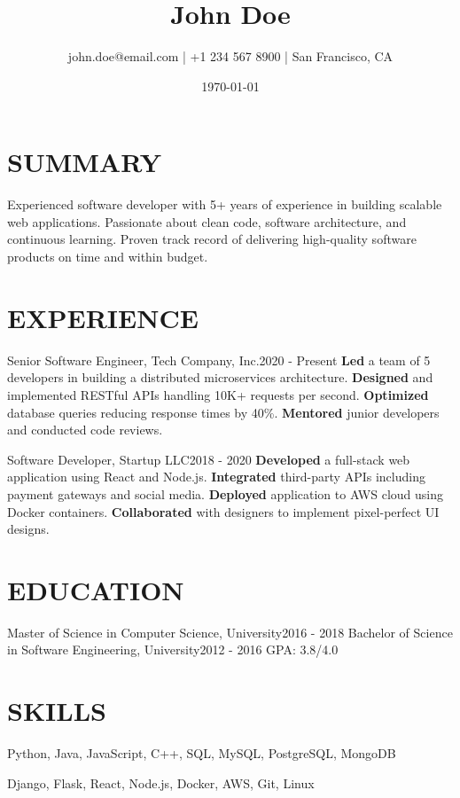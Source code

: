 \documentclass[10pt,a4paper]{article}
\begin{document}
\title{John Doe}
\author{john.doe@email.com | +1 234 567 8900 | San Francisco, CA}
\date{\today}
\maketitle
\vspace{-1cm}

\section{SUMMARY}
Experienced software developer with 5+ years of experience in building scalable web applications. Passionate about clean code, software architecture, and continuous learning. Proven track record of delivering high-quality software products on time and within budget.

\section{EXPERIENCE}
Senior Software Engineer, Tech Company, Inc.\hfill 2020 - Present
\textbf{Led} a team of 5 developers in building a distributed microservices architecture.
\textbf{Designed} and implemented RESTful APIs handling 10K+ requests per second.
\textbf{Optimized} database queries reducing response times by 40\%.
\textbf{Mentored} junior developers and conducted code reviews.

Software Developer, Startup LLC\hfill 2018 - 2020
\textbf{Developed} a full-stack web application using React and Node.js.
\textbf{Integrated} third-party APIs including payment gateways and social media.
\textbf{Deployed} application to AWS cloud using Docker containers.
\textbf{Collaborated} with designers to implement pixel-perfect UI designs.

\section{EDUCATION}
Master of Science in Computer Science, University\hfill 2016 - 2018
Bachelor of Science in Software Engineering, University\hfill 2012 - 2016
GPA: 3.8/4.0

\section{SKILLS}
\begin{description}
\item[\textbf{Programming Languages}] Python, Java, JavaScript, C++, SQL, MySQL, PostgreSQL, MongoDB
\item[\textbf{Frameworks \& Libraries}] Django, Flask, React, Node.js, Docker, AWS, Git, Linux
\end{description}
\end{document}
